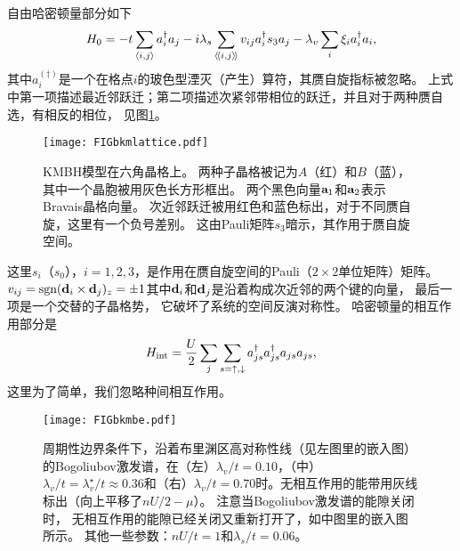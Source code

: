 自由哈密顿量部分如下
\begin{equation}\label{KMBHh0}
	H_0 = -t\sum_{\expval{i,j}}a^\dagger_i a_j-i\lambda _s\sum_{\langle\!\langle i,j \rangle\!\rangle} v_{ij} a^\dagger_i s_3 a_j - \lambda_v \sum_i \xi_i a^\dagger_i a_i,
\end{equation}
其中$a^{(\dagger)}_i$是一个在格点$i$的玻色型湮灭（产生）算符，其赝自旋指标被忽略。
上式中第一项描述最近邻跃迁；第二项描述次紧邻带相位的跃迁，并且对于两种赝自选，有相反的相位，
见图\ref{KMBHlattice}。%
\begin{figure}
    \centering
	\texttt{[image: FIGbkmlattice.pdf]}
	\caption{KMBH模型在六角晶格上。
	两种子晶格被记为$A$（红）和$B$（蓝），其中一个晶胞被用灰色长方形框出。
	两个黑色向量$\vb a_1$和$\vb a_2$表示Bravais晶格向量。
	次近邻跃迁被用红色和蓝色标出，对于不同赝自旋，这里有一个负号差别。
	这由Pauli矩阵$s_3$暗示，其作用于赝自旋空间。}
	\label{KMBHlattice}
\end{figure}
这里$s_i$（$s_0$），$i=1,2,3$，是作用在赝自旋空间的Pauli（$2\times 2$单位矩阵）矩阵。
$v_{ij}=\textnormal{sgn}(\vb d_i\times \vb d_j)_z=\pm 1$其中$\vb d_i$和$\vb d_j$是沿着构成次近邻的两个键的向量，
最后一项是一个交替的子晶格势，
它破坏了系统的空间反演对称性。
哈密顿量的相互作用部分是
\begin{equation}
	H_{\textnormal{int}}= \frac{U}{2}\sum_{j}\sum_{s=\uparrow,\downarrow} a^\dagger_{js}a^\dagger_{js}a_{js} a_{js},\label{hint}
\end{equation}
这里为了简单，我们忽略种间相互作用。



\begin{figure*}
    \centering
	\texttt{[image: FIGbkmbe.pdf]}
	\caption{周期性边界条件下，沿着布里渊区高对称性线（见左图里的嵌入图）的Bogoliubov激发谱，在（左）$\lambda_v/t=0.10$，（中）$\lambda_v/t=\lambda_v^\star/t \approx 0.36$和（右）$\lambda_v/t=0.70$时。无相互作用的能带用灰线标出（向上平移了$nU/2-\mu$）。
	注意当Bogoliubov激发谱的能隙关闭时，
	无相互作用的能隙已经关闭又重新打开了，如中图里的嵌入图所示。
	其他一些参数：$nU/t=1$和$\lambda _s/t=0.06$。}
	\label{KMBHbe}
\end{figure*}


